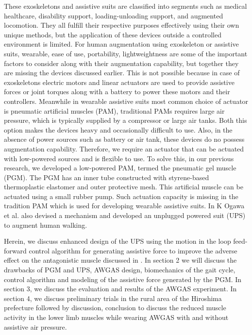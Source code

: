 \documentclass[paper,JRM,paper]{jaciiiarticle}
\begin{document}
These exoskeletons and assistive suits are classified into segments such as medical healthcare, disability support, loading-unloading support, and augmented locomotion. They all fulfill their respective purposes effectively using their own unique methods, but the application of these devices outside a controlled environment is limited. For human augmentation using exoskeleton or assistive suits, wearable, ease of use, portability, lightweightness are some of the important factors to consider along with their augmentation capability, but together they are missing the devices discussed earlier. This is not possible because in case of exoskeletons electric motors and linear actuators are used to provide assistive forces or joint torques along with a battery to power these motors and their controllers. Meanwhile in wearable assistive suits most common choice of actuator is pneumatic artificial muscles (PAM)\cite{10}, traditional PAMs requires large air pressure, which is typically supplied by a compressor or large air tanks. Both this option makes the devices heavy and occasionally difficult to use. Also, in the absence of power sources such as battery or air tank, these devices do no possess augmentation capability. Therefore, we require an actuator that can be actuated with low-powered sources and is flexible to use. To solve this, in our previous research\cite{11}, we developed a low-powered PAM, termed the pneumatic gel muscle (PGM). The PGM has an inner tube constructed with styrene-based thermoplastic elastomer and outer protective mesh. This artificial muscle can be actuated using a small rubber pump. Such actuation capacity is missing in the tradition PAM which is used for developing wearable assistive suits. In \cite{11} K Ogawa et al. also devised a mechanism and developed an unplugged powered suit (UPS) to augment human walking. 

Herein, we discuss enhanced design of the UPS using the motion in the loop feed-forward control algorithm for generating assistive force to improve the adverse effect on the antagonistic muscle discussed in \cite{11}. In section 2 we will discuss the drawbacks of PGM and UPS, AWGAS design, biomechanics of the gait cycle, control algorithm and modeling of the assistive force generated by the PGM. In section 3, we discuss the evaluation and results of the AWGAS experiment. In section 4, we discuss preliminary trials in the rural area of the Hiroshima prefecture followed by discussion, conclusion to discuss the reduced muscle activity in the lower limb muscles while wearing AWGAS with and without assistive air pressure.
\end{document}
